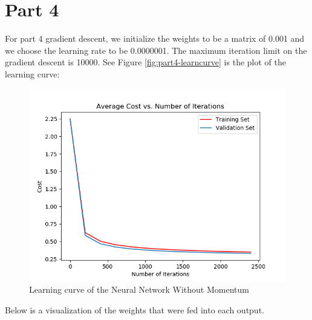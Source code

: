 \documentclass[10pt,letterpaper]{article}
\begin{document}
	\section{Part 4}
	For part 4 gradient descent, we initialize the weights to be a matrix of 0.001 and we choose the learning rate to be 0.0000001. The maximum iteration limit on the gradient descent is 10000.
	See Figure \ref{fig:part4-learncurve} is the plot of the learning curve:
	\begin{figure}[H]
		\centering
		\includegraphics[width=\linewidth]{part_4_validation_training_plot.png}
		\caption{Learning curve of the Neural Network Without Momentum}
		\label{fig:part4validationtrainingplot}
	\end{figure}

	Below is a visualization of the weights that were fed into each output.
\end{document}
